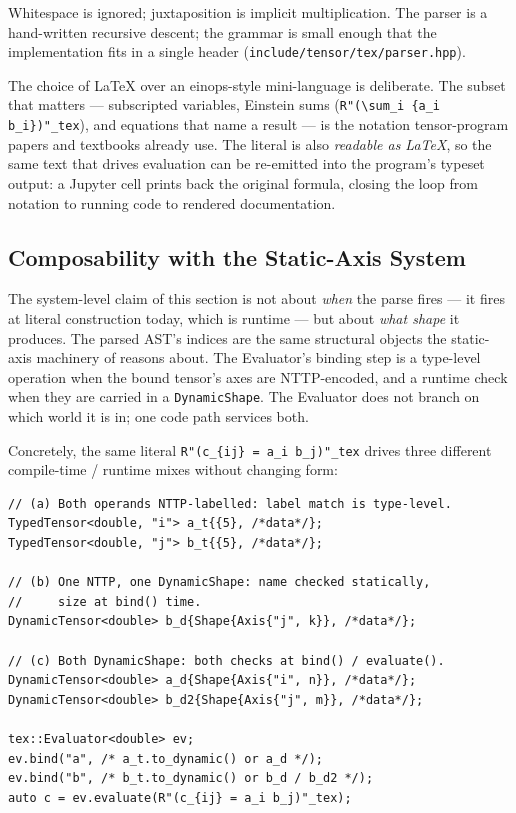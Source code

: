 \documentclass[10pt,twocolumn]{article}
\newcommand{\code}[1]{\texttt{#1}}
\begin{document}
Whitespace is ignored; juxtaposition is implicit multiplication. The
parser is a hand-written recursive descent; the grammar is small
enough that the implementation fits in a single header
(\code{include/tensor/tex/parser.hpp}).

The choice of LaTeX over an einops-style mini-language is deliberate.
The subset that matters --- subscripted variables, Einstein sums
(\code{R"(\textbackslash sum\_i \{a\_i b\_i\})"\_tex}), and equations
that name a result --- is the notation tensor-program papers and
textbooks already use. The literal is also \emph{readable as LaTeX},
so the same text that drives evaluation can be re-emitted into the
program's typeset output: a Jupyter cell prints back the original
formula, closing the loop from notation to running code to rendered
documentation.

\subsection{Composability with the Static-Axis System}
\label{sec:udl-composability}

The system-level claim of this section is not about \emph{when} the
parse fires --- it fires at literal construction today, which is
runtime --- but about \emph{what shape} it produces. The parsed AST's
indices are the same structural objects the static-axis machinery of
 reasons about. The Evaluator's binding step is a
type-level operation when the bound tensor's axes are NTTP-encoded,
and a runtime check when they are carried in a \code{DynamicShape}.
The Evaluator does not branch on which world it is in; one code path
services both.

Concretely, the same literal
\code{R"(c\_\{ij\} = a\_i b\_j)"\_tex} drives three different
compile-time / runtime mixes without changing form:

\begin{lstlisting}[language=cppx]
// (a) Both operands NTTP-labelled: label match is type-level.
TypedTensor<double, "i"> a_t{{5}, /*data*/};
TypedTensor<double, "j"> b_t{{5}, /*data*/};

// (b) One NTTP, one DynamicShape: name checked statically,
//     size at bind() time.
DynamicTensor<double> b_d{Shape{Axis{"j", k}}, /*data*/};

// (c) Both DynamicShape: both checks at bind() / evaluate().
DynamicTensor<double> a_d{Shape{Axis{"i", n}}, /*data*/};
DynamicTensor<double> b_d2{Shape{Axis{"j", m}}, /*data*/};

tex::Evaluator<double> ev;
ev.bind("a", /* a_t.to_dynamic() or a_d */);
ev.bind("b", /* b_t.to_dynamic() or b_d / b_d2 */);
auto c = ev.evaluate(R"(c_{ij} = a_i b_j)"_tex);
\end{lstlisting}
\end{document}
